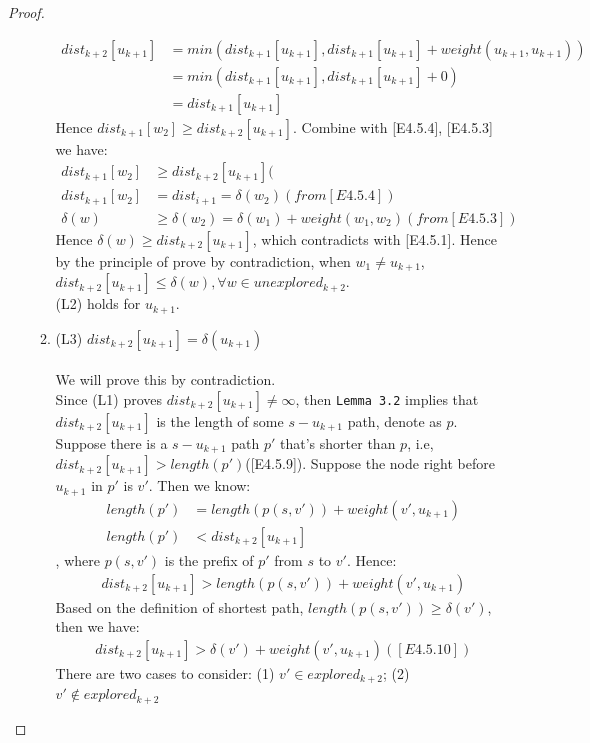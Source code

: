 \begin{proof}
\begin{itemize}
\begin{enumerate}
\begin{align*}
  dist_{k+2}[u_{k+1}] &= min(dist_{k+1}[u_{k+1}], dist_{k+1}[u_{k+1}] + weight(u_{k+1}, u_{k+1})) \\
                      &= min(dist_{k+1}[u_{k+1}], dist_{k+1}[u_{k+1}] + 0) \\
                      &= dist_{k+1}[u_{k+1}] 
  \end{align*}
  Hence $dist_{k+1}[w_2] \geq dist_{k+2}[u_{k+1}]$. Combine with [E4.5.4], [E4.5.3] we have: 
  \begin{align*}
    dist_{k+1}[w_2] &\geq dist_{k+2}[u_{k+1}] (\\
    dist_{k+1}[w_2] &= dist_{i+1} = \delta(w_2) (from [E4.5.4]) \\
    \delta(w) &\geq \delta(w_2) = \delta(w_1) + weight(w_1, w_2)(from [E4.5.3])
  \end{align*}
  Hence $\delta(w) \geq dist_{k+2}[u_{k+1}]$, which contradicts with [E4.5.1]. Hence by the principle of prove by contradiction, when $w_1 \neq u_{k+1}$, $dist_{k+2}[u_{k+1}] \leq \delta(w), \forall w \in unexplored_{k+2}$. 
  \\
  (L2) holds for $u_{k+1}$. 
  \\
  \item (L3) $dist_{k+2}[u_{k+1}] = \delta(u_{k+1})$
  \\\\
  We will prove this by contradiction. 
  \\
  Since (L1) proves $dist_{k+2}[u_{k+1}] \neq \infty$, then \texttt{Lemma 3.2} implies that $dist_{k+2}[u_{k+1}]$ is the length of some $s-u_{k+1}$ path, denote as $p$. Suppose there is a $s-u_{k+1}$ path $p'$ that's shorter than $p$, i.e, $dist_{k+2}[u_{k+1}] > length(p')$([E4.5.9]). Suppose the node right before $u_{k+1}$ in $p'$ is $v'$. Then we know: 
  \begin{align*}
  length(p') &= length(p(s, v')) + weight(v', u_{k+1}) \\
  length(p') &< dist_{k+2}[u_{k+1}]
  \end{align*}
  , where $p(s, v')$ is the prefix of $p'$ from $s$ to $v'$. Hence: 
  \begin{align*}
   dist_{k+2}[u_{k+1}] > length(p(s, v')) + weight(v', u_{k+1}) 
  \end{align*}
  Based on the definition of shortest path, $length(p(s, v')) \geq \delta(v')$, then we have: 
  \begin{align*}
   dist_{k+2}[u_{k+1}] > \delta(v') + weight(v', u_{k+1}) ([E4.5.10])
  \end{align*}
  There are two cases to consider: (1) $v' \in explored_{k+2}$; (2) $v' \notin explored_{k+2}$

\end{enumerate}
\end{itemize}
\end{proof}
